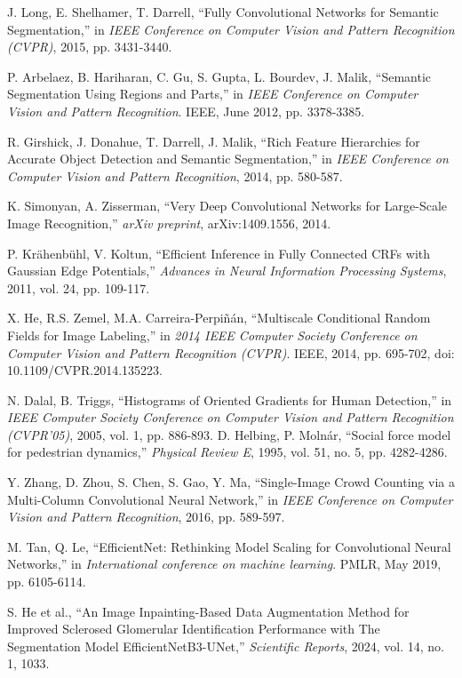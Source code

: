 \documentclass{article}
\begin{document}
\begin{multicols}{2}
\begin{thebibliography}{99}
J. Long, E. Shelhamer, T. Darrell, ``Fully Convolutional Networks for Semantic Segmentation,'' in \textit{IEEE Conference on Computer Vision and Pattern Recognition (CVPR)}, 2015, pp. 3431-3440.

P. Arbelaez, B. Hariharan, C. Gu, S. Gupta, L. Bourdev, J. Malik, ``Semantic Segmentation Using Regions and Parts,'' in \textit{IEEE Conference on Computer Vision and Pattern Recognition}. IEEE, June 2012, pp. 3378-3385.

R. Girshick, J. Donahue, T. Darrell, J. Malik, ``Rich Feature Hierarchies for Accurate Object Detection and Semantic Segmentation,'' in \textit{IEEE Conference on Computer Vision and Pattern Recognition}, 2014, pp. 580-587.

K. Simonyan, A. Zisserman, ``Very Deep Convolutional Networks for Large-Scale Image Recognition,'' \textit{arXiv preprint}, arXiv:1409.1556, 2014.

P. Krähenbühl, V. Koltun, ``Efficient Inference in Fully Connected CRFs with Gaussian Edge Potentials,'' \textit{Advances in Neural Information Processing Systems}, 2011, vol. 24, pp. 109-117.

X. He, R.S. Zemel, M.A. Carreira-Perpiñán, ``Multiscale Conditional Random Fields for Image Labeling,'' in \textit{2014 IEEE Computer Society Conference on Computer Vision and Pattern Recognition (CVPR)}. IEEE, 2014, pp. 695-702, doi: 10.1109/CVPR.2014.135223.

N. Dalal, B. Triggs, ``Histograms of Oriented Gradients for Human Detection,'' in \textit{IEEE Computer Society Conference on Computer Vision and Pattern Recognition (CVPR'05)}, 2005, vol. 1, pp. 886-893.
D. Helbing, P. Molnár, ``Social force model for pedestrian dynamics,'' \textit{Physical Review E}, 1995, vol. 51, no. 5, pp. 4282-4286.

Y. Zhang, D. Zhou, S. Chen, S. Gao, Y. Ma, ``Single-Image Crowd Counting via a Multi-Column Convolutional Neural Network,'' in \textit{IEEE Conference on Computer Vision and Pattern Recognition}, 2016, pp. 589-597.

M. Tan, Q. Le, ``EfficientNet: Rethinking Model Scaling for Convolutional Neural Networks,'' in \textit{International conference on machine learning}. PMLR, May 2019, pp. 6105-6114.

S. He et al., ``An Image Inpainting-Based Data Augmentation Method for Improved Sclerosed Glomerular Identification Performance with The Segmentation Model EfficientNetB3-UNet,'' \textit{Scientific Reports}, 2024, vol. 14, no. 1, 1033.


\end{thebibliography}
\end{multicols}
\end{document}
